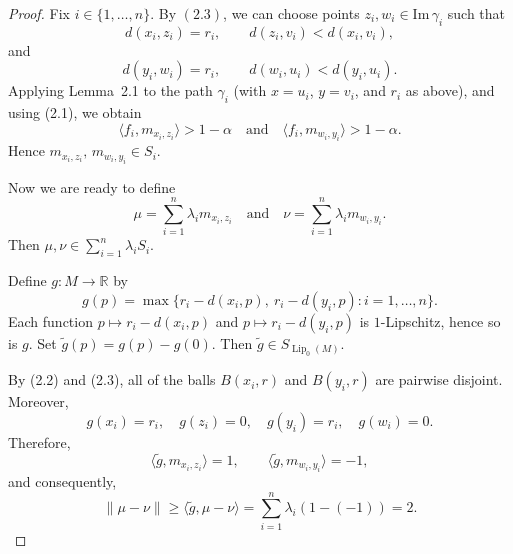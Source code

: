\documentclass[10pt,a4paper]{amsart}
\begin{document}
\begin{proof}
Fix $i\in \{1,\ldots,n\}$. 
By $(2.3)$, we can choose points $z_i,w_i\in\mathrm{Im}\,\gamma_i$
such that
\[
d(x_i,z_i)=r_i,
\qquad
d(z_i,v_i)<d(x_i,v_i),
\]
and
\[
d(y_i,w_i)=r_i,\qquad d(w_i,u_i)<d(y_i,u_i).\]
Applying Lemma~2.1 to the path $\gamma_i$
(with $x=u_i$, $y=v_i$, and $r_i$ as above),
and using (2.1), we obtain
\[
\langle f_i,m_{x_i,z_i}\rangle>1-\alpha
\quad\text{and}\quad
\langle f_i,m_{w_i,y_i}\rangle>1-\alpha.
\]
Hence $m_{x_i,z_i},\, m_{w_i,y_i}\in S_i.$

Now we are ready to define
\[
\mu=\sum_{i=1}^n\lambda_i m_{x_i,z_i}
\quad\text{and}\quad
\nu=\sum_{i=1}^n\lambda_i m_{w_i,y_i}.
\]
Then $\mu,\nu\in\sum_{i=1}^n\lambda_i S_i$.

Define $g:M\to\mathbb R$ by
\[
g(p)=\max\bigl\{ r_i-d(x_i,p),\ r_i-d(y_i,p): i=1,\dots,n\bigr\}.
\]
Each function $p\mapsto r_i-d(x_i,p)$ and $p\mapsto r_i-d(y_i,p)$
is $1$-Lipschitz, hence so is $g$. Set $\tilde g(p)=g(p)-g(0)$. Then 
$\tilde g\in S_{\operatorname{Lip}_0(M)}$.

By (2.2) and (2.3), all of the balls $B(x_i,r)$ and $B(y_i,r)$ are pairwise disjoint.
Moreover,
\[
g(x_i)=r_i,\quad g(z_i)=0,
\quad
g(y_i)=r_i,\quad g(w_i)=0.
\]
Therefore,
\[
\langle \tilde g,m_{x_i,z_i}\rangle=1,
\qquad
\langle \tilde g,m_{w_i,y_i}\rangle=-1,
\]
and consequently,
\[\|\mu-\nu\|\geq
\langle \tilde g,\mu-\nu\rangle
=\sum_{i=1}^n\lambda_i(1-(-1))=2.
\]

 
\end{proof}
\end{document}
